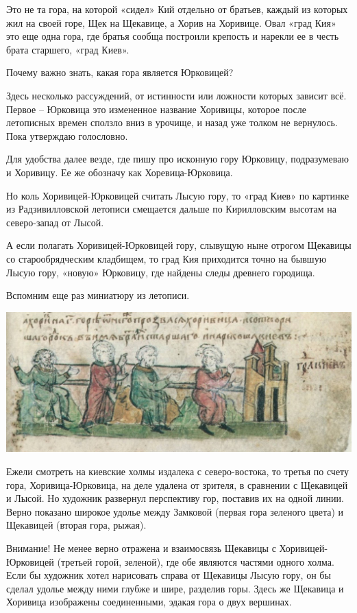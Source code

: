 Это не та гора, на которой «сидел» Кий отдельно от братьев, каждый из которых жил на своей горе, Щек на Щекавице, а Хорив на Хоривице. Овал «град Кия» это еще одна гора, где братья сообща построили крепость и нарекли ее в честь брата старшего, «град Киев».

Почему важно знать, какая гора является Юрковицей?

Здесь несколько рассуждений, от истинности или ложности которых зависит всё. Первое – Юрковица это измененное название Хоривицы, которое после летописных времен сползло вниз в урочище, и назад уже толком не вернулось. Пока утверждаю голословно.

Для удобства далее везде, где пишу про исконную гору Юрковицу, подразумеваю и Хоривицу. Ее же обозначу как Хоревица-Юрковица.

Но коль Хоривицей-Юрковицей считать Лысую гору, то «град Киев» по картинке из Радзивилловской летописи смещается дальше по Кирилловским высотам на северо-запад от Лысой.

А если полагать Хоривицей-Юрковицей гору, слывущую ныне отрогом Щекавицы со старообрядческим кладбищем, то град Кия приходится точно на бывшую Лысую гору, «новую» Юрковицу, где найдены следы древнего городища.

Вспомним еще раз миниатюру из летописи.

\begin{center}
\includegraphics[width=\linewidth]{chast-kirvys/poisk-yourk/radz-tri-brata.jpg}
\end{center} 

Ежели смотреть на киевские холмы издалека с северо-востока, то третья по счету гора, Хоривица-Юрковица, на деле удалена от зрителя, в сравнении с Щекавицей и Лысой. Но художник развернул перспективу гор, поставив их на одной линии. Верно показано широкое удолье между Замковой (первая гора зеленого цвета) и Щекавицей (вторая гора, рыжая). 

Внимание! Не менее верно отражена и взаимосвязь Щекавицы с Хоривицей-Юрковицей (третьей горой, зеленой), где обе являются частями одного холма. Если бы художник хотел нарисовать справа от Щекавицы Лысую гору, он бы сделал удолье между ними глубже и шире, разделив горы. Здесь же Щекавица и Хоривица изображены соединенными, эдакая гора о двух вершинах.

